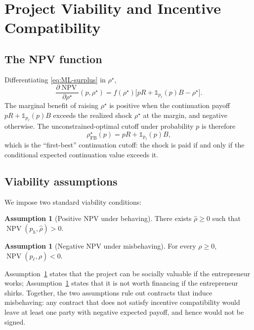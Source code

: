 \documentclass[11pt,a4paper,oneside]{book}
\def\geq{\geqslant}
\DeclareMathOperator{\NPV}{NPV}
\theoremstyle{plain}
\theoremstyle{definition}
\newtheorem{assumption}[theorem]{Assumption}
\theoremstyle{remark}
\numberwithin{equation}{chapter}
\begin{document}
\section{Project Viability and Incentive Compatibility}
\label{sec:ML-viability}

\subsection{The NPV function}

Differentiating \eqref{eq:ML-surplus} in $\rho^\star$,
\begin{equation}\label{eq:ML-dNPV}
  \frac{\partial \NPV}{\partial \rho^\star}(p, \rho^\star) = f(\rho^\star) \bigl[ p R + \mathbb{1}_{p_\ell}(p) B - \rho^\star \bigr].
\end{equation}
The marginal benefit of raising $\rho^\star$ is positive when the continuation payoff $p R + \mathbb{1}_{p_\ell}(p) B$ exceeds the realized shock $\rho^\star$ at the margin, and negative otherwise.
The unconstrained-optimal cutoff under probability $p$ is therefore
\begin{equation*}
  \rho^\star_{\text{FB}}(p) = p R + \mathbb{1}_{p_\ell}(p) B,
\end{equation*}
which is the ``first-best'' continuation cutoff: the shock is paid if and only if the conditional expected continuation value exceeds it.

\subsection{Viability assumptions}

We impose two standard viability conditions:

\begin{assumption}[Positive NPV under behaving]\label{ass:ML-NPV-h}
There exists $\widehat{\rho} \geq 0$ such that $\NPV(p_h, \widehat{\rho}) > 0$.
\end{assumption}

\begin{assumption}[Negative NPV under misbehaving]\label{ass:ML-NPV-l}
For every $\rho \geq 0$, $\NPV(p_\ell, \rho) < 0$.
\end{assumption}

Assumption~\ref{ass:ML-NPV-h} states that the project can be socially valuable if the entrepreneur works; Assumption~\ref{ass:ML-NPV-l} states that it is not worth financing if the entrepreneur shirks.
Together, the two assumptions rule out contracts that induce misbehaving: any contract that does not satisfy incentive compatibility would leave at least one party with negative expected payoff, and hence would not be signed.
\end{document}
